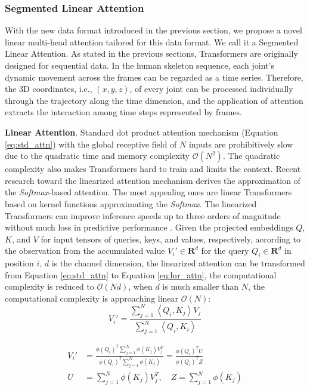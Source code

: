 \documentclass[letterpaper]{article} %
\begin{document}
\subsubsection{Segmented Linear Attention} \label{linear_attn}
With the new data format introduced in the previous section, we propose a novel linear multi-head attention tailored for this data format. We call it a Segmented Linear Attention. As stated in the previous sections, Transformers are originally designed for sequential data. In the human skeleton sequence, each joint's dynamic movement across the frames can be regarded as a time series. Therefore, the 3D coordinates, i.e., $(x, y, z)$, of every joint can be processed individually through the trajectory along the time dimension, and the application of attention extracts the interaction among time steps represented by frames. 

\textbf{Linear Attention}. Standard dot product attention mechanism \cite{attn2017all} (Equation \ref{eq:std_attn}) with the global receptive field of $N$ inputs are prohibitively slow due to the quadratic time and memory complexity $\mathcal{O}(N^2)$. The quadratic complexity also makes Transformers hard to train and limits the context. Recent research toward the linearized attention mechanism derives the approximation of the \textit{Softmax}-based attention. The most appealing ones are linear Transformers \cite{katharopoulos20a, choromanski2021rethinking, shen2021efficient} based on kernel functions approximating the \textit{Softmax}. The linearized Transformers can improve inference speeds up to three orders of magnitude without much loss in predictive performance \cite{tay2020efficient}.
Given the projected embeddings $Q$, $K$, and $V$ for input tensors of queries, keys, and values, respectively, according to the observation from the accumulated value $V_i' \in \mathbf{R}^{d}$ for the query $Q_i \in \mathbf{R}^{d}$ in position $i$, $d$ is the channel dimension, the linearized attention can be transformed from Equation \ref{eq:std_attn} to Equation \ref{eq:lnr_attn}, the computational complexity is reduced to $\mathcal{O}(Nd)$, when $d$ is much smaller than $N$, the computational complexity is approaching linear $\mathcal{O}(N)$:
\begin{equation}
    V_i' = \frac{\sum_{j=1}^N \left< Q_i, K_j \right> V_j}{\sum_{j=1}^N \left< Q_i, K_i \right>}
    \label{eq:std_attn}
\end{equation}

\begin{equation}
    \begin{split}
        V_i' &= \frac{\phi(Q_i)^T \sum_{j=1}^N \phi(K_j) V_j^T}{\phi(Q_i)^T \sum_{j=1}^N \phi(K_j)} = \frac{\phi(Q_i)^T U}{\phi(Q_i)^T Z} \\ 
        U &= \sum_{j=1}^N \phi(K_j) V_j^T, \quad Z = \sum_{j=1}^N \phi(K_j)
    \end{split}
    \label{eq:lnr_attn}
\end{equation}
\end{document}

